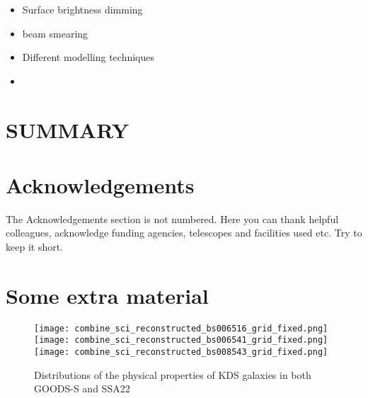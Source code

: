 \documentclass[a4paper,fleqn,usenatbib]{mn2e}
\begin{document}
\begin{itemize}
    \item Surface brightness dimming
    \item beam smearing
    \item Different modelling techniques
    \item 
\end{itemize}

\section{SUMMARY}



\section*{Acknowledgements}

The Acknowledgements section is not numbered. Here you can thank helpful
colleagues, acknowledge funding agencies, telescopes and facilities used etc.
Try to keep it short.




%


\clearpage 

%




\appendix

\section{Some extra material}

\begin{figure*}
\centering
\texttt{[image: combine\_sci\_reconstructed\_bs006516\_grid\_fixed.png]}
\texttt{[image: combine\_sci\_reconstructed\_bs006541\_grid\_fixed.png]}
\texttt{[image: combine\_sci\_reconstructed\_bs008543\_grid\_fixed.png]}
\caption{Distributions of the physical properties of KDS galaxies in both GOODS-S and SSA22}
\label{fig:grids}
\end{figure*}



\bsp    %
\label{lastpage}
\end{document}
